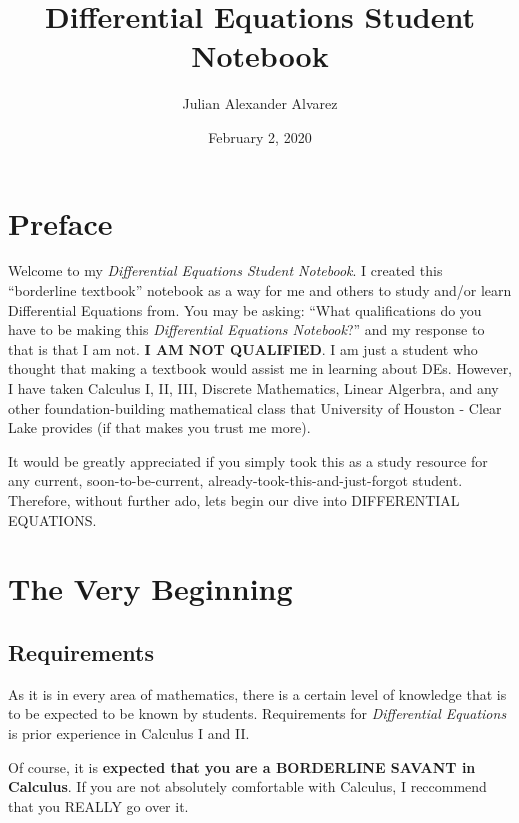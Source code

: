 \documentclass[letter, 11pt]{book}
\begin{document}
\title{\Large{\textbf{Differential Equations Student Notebook}}}
\author{Julian Alexander Alvarez}
\date{February 2, 2020}
\maketitle
\let\cleardoublepage\clearpage
\tableofcontents

\setcounter{page}{2}
\fancyhf{}
\renewcommand{\headrulewidth}{2pt}
\renewcommand{\footrulewidth}{1pt}

\fancyhead[LE]{\leftmark}
\fancyhead[RO]{\leftmark}
\fancyfoot[LE,RO]{\thepage}


\chapter{Preface}
Welcome to my \textit{Differential Equations Student Notebook}. I created this ``borderline textbook'' notebook
as a way for me and others to study and/or learn Differential Equations from. You may be asking: ``What qualifications do you have to be making this \textit{Differential Equations Notebook}?''
and my response to that is that I am not. \textbf{I AM NOT QUALIFIED}. I am just a student who thought that making a textbook would assist me in learning about DEs. However, I have taken Calculus I, II, III, Discrete Mathematics, Linear Algerbra, and any other foundation-building mathematical class that University of Houston - Clear Lake provides (if that makes you trust me more).


It would be greatly appreciated if you simply took this as a study resource for any current, soon-to-be-current, already-took-this-and-just-forgot student.
Therefore, without further ado, lets begin our dive into DIFFERENTIAL EQUATIONS.
\newpage
\chapter{The Very Beginning}
\section{Requirements}
As it is in every area of mathematics, there is a certain level of knowledge that is to be expected to be known by students.
Requirements for \textit{Differential Equations} is prior experience in Calculus I and II.

Of course, it is \textbf{expected that you are a BORDERLINE SAVANT in Calculus}. If you are not absolutely comfortable with Calculus, I reccommend that you REALLY go over it.
\end{document}
